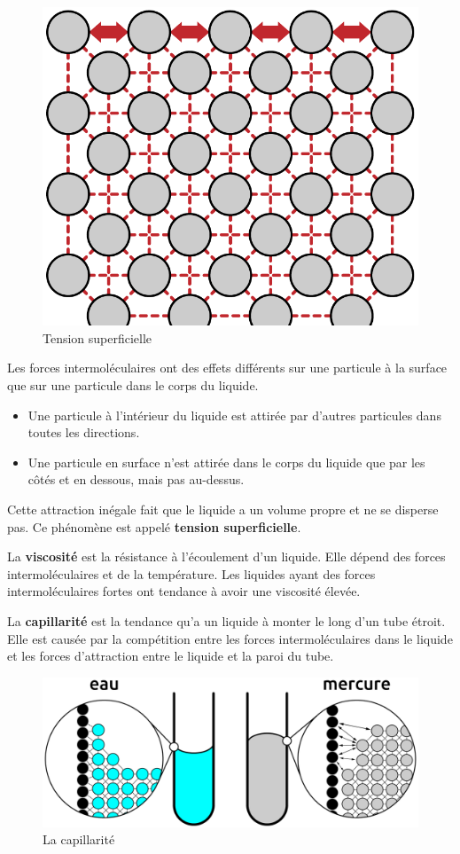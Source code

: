 \documentclass[
  11pt,
  a4paper,
  openany]{book}
\providecommand{\tightlist}{%
  \setlength{\itemsep}{0pt}\setlength{\parskip}{0pt}}
\begin{document}
\begin{figure}

{\centering \includegraphics[width=0.33\linewidth]{images/tension-surface} 

}

\caption{Tension superficielle}\label{fig:tension-surface}
\end{figure}

Les forces intermoléculaires ont des effets différents sur une particule à la surface que sur une particule dans le corps du liquide.

\begin{itemize}
\tightlist
\item
  Une particule à l'intérieur du liquide est attirée par d'autres particules dans toutes les directions.
\item
  Une particule en surface n'est attirée dans le corps du liquide que par les côtés et en dessous, mais pas au-dessus.
\end{itemize}

Cette attraction inégale fait que le liquide a un volume propre et ne se disperse pas. Ce phénomène est appelé \textbf{tension superficielle}.

La \textbf{viscosité} est la résistance à l'écoulement d'un liquide. Elle dépend des forces intermoléculaires et de la température. Les liquides ayant des forces intermoléculaires fortes ont tendance à avoir une viscosité élevée.

La \textbf{capillarité} est la tendance qu'a un liquide à monter le long d'un tube étroit. Elle est causée par la compétition entre les forces intermoléculaires dans le liquide et les forces d'attraction entre le liquide et la paroi du tube.

\begin{figure}

{\centering \includegraphics[width=0.67\linewidth]{images/capillarity} 

}

\caption{La capillarité}\label{fig:capillarity}
\end{figure}
\end{document}
